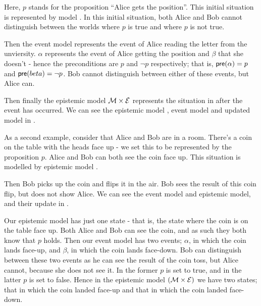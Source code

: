 \documentclass[10pt, a4paper]{report}
\begin{document}
Here, $p$ stands for the proposition ``Alice gets the position''. This initial
situation is represented by model . In this initial situation, both Alice
and Bob cannot distinguish between the worlds where $p$ is true and where $p$ is
not true.

Then the event model  represents the event of Alice reading the letter
from the unviersity. $\alpha$ represents the event of Alice getting the position
and $\beta$ that she doesn't - hence the preconditions are $p$ and $\neg
p$ respectively; that is, $\textsf{pre}(\alpha) = p$ and $\textsf{pre}(beta) = \neg p$. Bob
cannot distinguish between either of these events, but Alice can.

Then finally the epistemic model $\mathcal{M} \times \mathcal{E}$ represents the situation
in  after the event  has occurred. We can see the epistemic model ,
event model  and updated model  in .

\bigskip

As a second example, consider that Alice and Bob are in a room. There's a coin
on the table with the heads face up - we set this to be represented by the
proposition $p$. Alice and Bob can both see the coin face up. This situation is
modelled by epistemic model .

Then Bob picks up the coin and flips it in the air. Bob sees the result of this
coin flip, but does not show Alice. We can see the event model and epistemic
model, and their update in .

Our epistemic model has just one state - that is, the state where the coin is on
the table face up. Both Alice and Bob can see the coin, and as such they both
know that $p$ holds. Then our event model has two events; $\alpha$, in which the
coin lands face-up, and $\beta$, in which the coin lands face-down. Bob can
distinguish between these two events as he can see the result of the coin toss,
but Alice cannot, because she does not see it. In the former $p$ is set to true,
and in the latter $p$ is set to false. Hence in the epistemic model $(\mathcal{M}
\times \mathcal{E})$ we have two states; that in which the coin landed face-up and
that in which the coin landed face-down.
\end{document}
